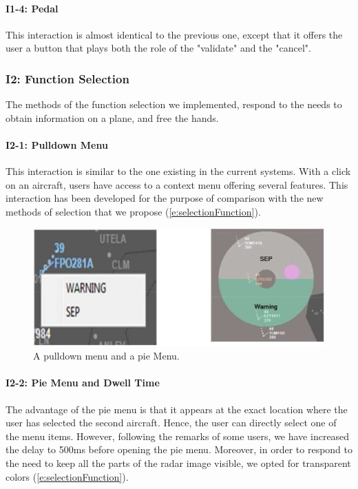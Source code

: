 \paragraph{I1-4: Pedal}
This interaction is almost identical to the previous one,
except that it offers the user a button that plays both the role
of the "validate" and the "cancel".

\subsubsection{I2: Function Selection}
The methods of the function selection we implemented,
respond to the needs to obtain information on a plane, and
free the hands.
 
\paragraph{I2-1: Pulldown Menu}
This interaction is similar to the one existing in the current
systems. With a click on an aircraft, users have access to a
context menu offering several features. This interaction has
been developed for the purpose of comparison with the new
methods of selection that we propose (\autoref{e:selectionFunction}).
\begin{figure}
 \centering
	\includegraphics[width=\textwidth]{Figures/selectionFunction.png}
	\caption{
	A pulldown menu and a pie Menu.}
	\label{e:selectionFunction}
\end{figure}

\paragraph{I2-2: Pie Menu and Dwell Time}
The advantage of the pie menu is that it appears at the exact
location where the user has selected the second aircraft.
Hence, the user can directly select one of the menu items.
However, following the remarks of some users, we have
increased the delay to 500ms before opening the pie menu.
Moreover, in order to respond to the need to keep all the
parts of the radar image visible, we opted for transparent
colors (\autoref{e:selectionFunction}).

